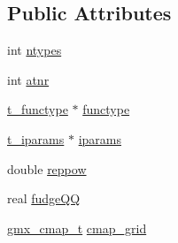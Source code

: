 \subsection*{\-Public \-Attributes}
\begin{DoxyCompactItemize}
\item 
int \hyperlink{structgmx__ffparams__t_a08edf5ff2eda696e11e0c2bcc9b60555}{ntypes}
\item 
int \hyperlink{structgmx__ffparams__t_a0bbf906344980fc3d5af5872db5b8ff4}{atnr}
\item 
\hyperlink{include_2types_2idef_8h_a8150aed9cb62c0b3826244d7caeb0a57}{t\-\_\-functype} $\ast$ \hyperlink{structgmx__ffparams__t_ae11af43668be563621753425004b34c3}{functype}
\item 
\hyperlink{uniont__iparams}{t\-\_\-iparams} $\ast$ \hyperlink{structgmx__ffparams__t_a58593b5da98dabe1ac8b7d76187e323a}{iparams}
\item 
double \hyperlink{structgmx__ffparams__t_aa45b66a436840adc0bb1e7fb21a3a2f0}{reppow}
\item 
real \hyperlink{structgmx__ffparams__t_aad03f8442f30116654a9b6e7c8b155f5}{fudge\-Q\-Q}
\item 
\hyperlink{structgmx__cmap__t}{gmx\-\_\-cmap\-\_\-t} \hyperlink{structgmx__ffparams__t_ac2e74e19f8bfd1f20b5bba03606e8784}{cmap\-\_\-grid}
\end{DoxyCompactItemize}


